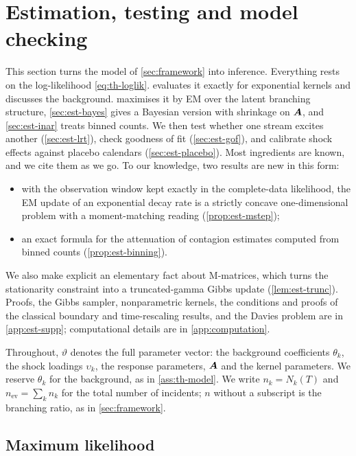 \section{Estimation, testing and model checking}\label{sec:estimation}

This section turns the model of \cref{sec:framework} into inference. Everything rests on
the log-likelihood \eqref{eq:th-loglik}.  evaluates it exactly for
exponential kernels and discusses the background.  maximises it by EM
over the latent branching structure, \cref{sec:est-bayes} gives a Bayesian version with
shrinkage on $\bm{A}$, and \cref{sec:est-inar} treats binned counts. We then test whether
one stream excites another (\cref{sec:est-lrt}), check goodness of fit
(\cref{sec:est-gof}), and calibrate shock effects against placebo calendars
(\cref{sec:est-placebo}). Most ingredients are known, and we cite them as we go. To our
knowledge, two results are new in this form:
\begin{itemize}
  \item with the observation window kept exactly in the complete-data likelihood, the
    EM update of an exponential decay rate is a strictly concave one-dimensional problem
    with a moment-matching reading (\cref{prop:est-mstep});
  \item an exact formula for the attenuation of contagion estimates computed from
    binned counts (\cref{prop:est-binning}).
\end{itemize}
We also make explicit an elementary fact about M-matrices, which turns the stationarity
constraint into a truncated-gamma Gibbs update (\cref{lem:est-trunc}). Proofs, the Gibbs
sampler, nonparametric kernels, the conditions and proofs of the classical boundary and
time-rescaling results, and the Davies problem are in \cref{app:est-supp}; computational
details are in \cref{app:computation}.

Throughout, $\vartheta$ denotes the full parameter vector: the background coefficients
$\theta_k$, the shock loadings $\upsilon_k$, the response parameters, $\bm{A}$ and the kernel
parameters. We reserve $\theta_k$ for the background, as in \cref{ass:th-model}. We write
$n_k=N_k(T)$ and $n_{\mathrm{ev}}=\sum_kn_k$ for the total number of incidents; $n$
without a subscript is the branching ratio, as in \cref{sec:framework}.

\subsection{Maximum likelihood}\label{sec:est-mle}

